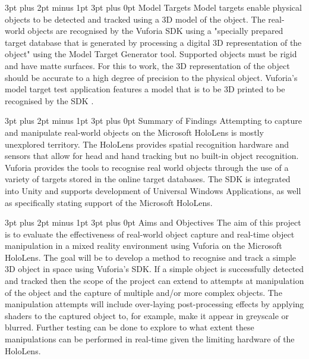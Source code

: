 \documentclass[12pt,a4paper]{article}
\makeatletter
\renewcommand\paragraph{\@startsection {paragraph}{1}{0mm} %
	                           {3pt plus 2pt minus 1pt} %
	                           {3pt plus 0pt} %
	                           {\normalfont}}
\renewcommand\subsubsection{\@startsection {subsubsection}{1}{0mm} %
	                           {3pt plus 2pt minus 1pt} %
	                           {3pt plus 0pt} %
	                           {\normalfont\bfseries}}
\renewcommand\subsection{\@startsection {subsection}{1}{0mm} %
                               {3pt plus 2pt minus 1pt} %
                               {3pt plus 0pt} %
                               {\large\bfseries}}
\makeatother
\begin{document}
\paragraph{Model Targets}
Model targets enable physical objects to be detected and tracked using a 3D model of the object. The real-world objects are recognised by the Vuforia SDK using a "specially prepared target database that is generated by processing a digital 3D representation of the object" using the Model Target Generator tool. Supported objects must be rigid and have matte surfaces. For this to work, the 3D representation of the object should be accurate to a high degree of precision to the physical object. Vuforia's model target test application features a model that is to be 3D printed to be recognised by the SDK \cite{vuforiamodeltargets}.

\subsubsection{Summary of Findings}
Attempting to capture and manipulate real-world objects on the Microsoft HoloLens is mostly unexplored territory. The HoloLens provides spatial recognition hardware and sensors that allow for head and hand tracking but no built-in object recognition. Vuforia provides the tools to recognise real world objects through the use of a variety of targets stored in the online target databases. The SDK is integrated into Unity and supports development of Universal Windows Applications, as well as specifically stating support of the Microsoft HoloLens. 

\subsection{Aims and Objectives}
The aim of this project is to evaluate the effectiveness of real-world object capture and real-time object manipulation in a mixed reality environment using Vuforia on the Microsoft HoloLens. The goal will be to develop a method to recognise and track a simple 3D object in space using Vuforia's SDK. If a simple object is successfully detected and tracked then the scope of the project can extend to attempts at manipulation of the object and the capture of multiple and/or more complex objects. The manipulation attempts will include over-laying post-processing effects by applying shaders to the captured object to, for example, make it appear in greyscale or blurred. Further testing can be done to explore to what extent these manipulations can be performed in real-time given the limiting hardware of the HoloLens.
\end{document}
